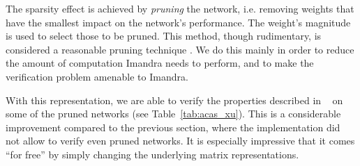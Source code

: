 \documentclass[runningheads]{llncs}
\begin{document}
\noindent The sparsity effect is achieved by \emph{pruning} the network, i.e. removing weights that have the smallest impact on the network's performance. The weight's magnitude is used to select those to be pruned. This method, though rudimentary, is considered a reasonable pruning technique \cite{lecun_optimal_1989}.
%
We do this mainly in order to reduce the amount of computation Imandra needs to perform, and to make the verification problem amenable to Imandra.

With this representation, we are able to verify the properties described in ~\cite{KaBaDiJuKo17Reluplex} on some of the pruned networks (see Table~\ref{tab:acas_xu}).
This is a considerable improvement compared to the previous section, where the implementation did not allow to verify even pruned networks. It is especially impressive that it comes ``for free'' by simply changing the underlying matrix representations.
\end{document}
